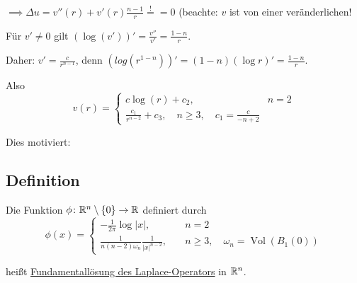 $\implies \Delta u = v''(r) + v'(r) \frac{n - 1}{r} \overset{!}{=} = 0$ (beachte: $v$ ist von einer veränderlichen!

Für $v' \neq 0$ gilt $(\log(v'))' = \frac{v''}{v'} = \frac{1 - n}{r}$.

Daher: $v' = \frac{c}{r^{n - 1}}$, denn  $(log(r^{1 - n}))' = (1 - n)(\log r)' = \frac{ 1 - n}{r}$.

Also
$$
v(r) = \begin{cases} c \log(r) + c_2, \quad& n = 2 \\ \frac{c_1}{r^{n - 2}} + c_3, \quad n \geq 3, \quad c_1 = \frac{c}{-n + 2} \end{cases}
$$

Dies motiviert:

\subsection{Definition}

Die Funktion $\phi \colon \mathbb{R}^n \setminus \{0\} \to \mathbb{R}$ definiert durch
$$
\phi(x) = \begin{cases} -\frac{1}{2\pi} \log{|x|},  \quad & n = 2 \\ \frac{1}{n(n-2) \omega_n} \frac{1}{|x|^{n - 2}}, \quad & n\geq 3, \quad \omega_n = \operatorname{Vol}(B_1(0)) \end{cases}
$$

heißt \underline{Fundamentallösung des Laplace-Operators} in $\mathbb{R}^n$. 




